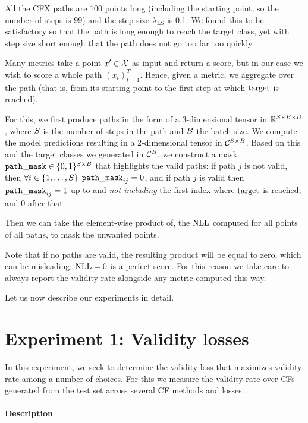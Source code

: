 \documentclass[../main.tex]{subfiles}
\begin{document}
All the CFX paths are 100 points long (including the starting point, so the number of steps is 99) and the step size $\lambda_\text{LS}$ is 0.1. We found this to be satisfactory so that the path is long enough to reach the target class, yet with step size short enough that the path does not go too far too quickly.

Many metrics take a point $x' \in \mathcal{X}$ as input and return a score, but in our case we wish to score a whole path $(x_t)_{t=1}^T$.
Hence, given a metric, we aggregate over the path (that is, from its starting point to the first step at which $\mathrm{target}$ is reached).

For this, we first produce paths in the form of a 3-dimensional tensor in $\mathbb{R}^{S \times B \times D}$,
where $S$ is the number of steps in the path and $B$ the batch size.
We compute the model predictions resulting in a 2-dimensional tensor in $\mathcal{C}^{S \times B}$.
Based on this and the target classes we generated in $\mathcal{C}^B$, we construct a mask $\mathtt{path\_mask} \in \{0, 1\}^{S \times B}$ that highlights the valid paths:
if path $j$ is not valid, then
$\forall i \in \{1, \ldots, S\}$ ${\mathtt{path\_mask}_{ij} = 0}$, and if path $j$ is valid then $\mathtt{path\_mask}_{ij} = 1$ up to and \emph{not including} the first index where $\mathrm{target}$ is reached, and 0 after that.

Then we can take the element-wise product of, \eg{} the $\text{NLL}$ computed for all points of all paths, to mask the unwanted points.

Note that if no paths are valid, the resulting product will be equal to zero, which can be misleading: $\text{NLL} = 0$ is a perfect score.
For this reason we take care to always report the validity rate alongside any metric computed this way.

Let us now describe our experiments in detail.

\section{Experiment 1: Validity losses}

In this experiment, we seek to determine the validity loss that maximizes validity rate among a number of choices.
For this we measure the validity rate over CFs generated from the test set across several CF methods and losses.

\paragraph{Description}
\label{validity_losses/description}
\end{document}
